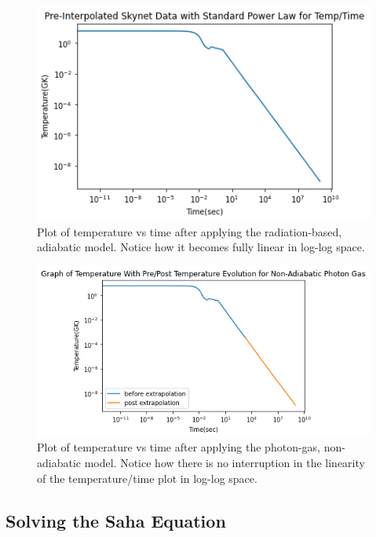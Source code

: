\documentclass[11pt,a4paper]{article}
\begin{document}
\begin{figure}[h!]
  \includegraphics[scale = .8]{linear_temp.png}
  \centering
  \caption{Plot of temperature vs time after applying the radiation-based, adiabatic model. Notice how it becomes fully linear in log-log space.}
\end{figure} 


\begin{figure}[h!]
  \includegraphics[scale = .8]{photon_only.png}
  \centering
  \caption{Plot of temperature vs time after applying the photon-gas, non-adiabatic model. Notice how there is no interruption in the linearity of the temperature/time plot in log-log space.}
\end{figure} 

\pagebreak

\subsection{Solving the Saha Equation}
\end{document}
